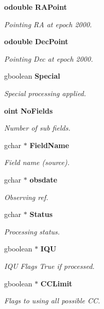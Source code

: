 \begin{CompactItemize}
{\bf odouble} {\bf RAPoint}
\begin{CompactList}\small\item\em Pointing RA at epoch 2000. \item\end{CompactList}\item 
{\bf odouble} {\bf Dec\-Point}
\begin{CompactList}\small\item\em Pointing Dec at epoch 2000. \item\end{CompactList}\item 
gboolean {\bf Special}
\begin{CompactList}\small\item\em Special processing applied. \item\end{CompactList}\item 
{\bf oint} {\bf No\-Fields}
\begin{CompactList}\small\item\em Number of sub fields. \item\end{CompactList}\item 
gchar $\ast$ {\bf Field\-Name}
\begin{CompactList}\small\item\em Field name (source). \item\end{CompactList}\item 
gchar $\ast$ {\bf obsdate}
\begin{CompactList}\small\item\em Observing ref. \item\end{CompactList}\item 
gchar $\ast$ {\bf Status}
\begin{CompactList}\small\item\em Processing status. \item\end{CompactList}\item 
gboolean $\ast$ {\bf IQU}
\begin{CompactList}\small\item\em IQU Flags True if processed. \item\end{CompactList}\item 
gboolean $\ast$ {\bf CCLimit}
\begin{CompactList}\small\item\em Flags to using all possible CC. \item\end{CompactList}\item 

\end{CompactItemize}
